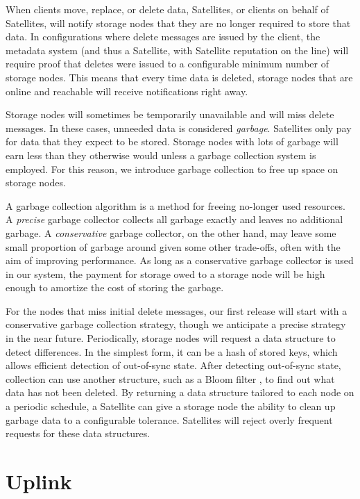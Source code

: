 \documentclass[8pt,fleqn,openany]{book}
\begin{document}
When clients move, replace, or delete data, Satellites, or
clients on behalf of Satellites, will notify storage nodes
that they are no longer required to store that data.
In configurations where delete messages are issued by the client,
the metadata system (and thus a
Satellite, with Satellite reputation on the line) will require proof that
deletes were issued to a configurable minimum number of storage nodes.
This means that every time
data is deleted, storage nodes that are online and reachable will receive
notifications right away.

Storage nodes will sometimes be temporarily unavailable and will miss delete
messages. In these cases, unneeded data is considered
{\em garbage}. Satellites only pay for data that they expect to be stored. Storage
nodes with lots of garbage will earn less than they otherwise would
unless a garbage collection system is employed. For this reason, we
introduce garbage collection to free up space on storage nodes.

A garbage collection algorithm is a method for freeing no-longer used resources.
A {\em precise} garbage collector collects all garbage exactly and
leaves no additional garbage. A {\em conservative} garbage collector, on the
other hand, may
leave some small proportion of garbage around given some other trade-offs,
often with the aim of improving performance.
As long as a conservative garbage collector is used in our system, the payment for
storage owed to a storage node will be high enough to amortize the cost of
storing the garbage.

For the nodes that miss initial delete messages,
our first release will start with a
conservative garbage collection strategy,
though we anticipate a precise strategy in the near future.
Periodically, storage nodes will request
a data structure to detect differences. In the simplest form, it can be a hash
of stored keys, which allows efficient detection of out-of-sync state. After
detecting out-of-sync state, collection can use another structure, such as a
Bloom filter \cite{bloom-filter}, to find out what data has not been
deleted.
By returning a data
structure tailored to each node on a periodic schedule, a Satellite can give a
storage node the ability to clean up garbage data to a configurable tolerance.
Satellites will reject overly frequent requests for these data structures.

\section{Uplink}
\end{document}
